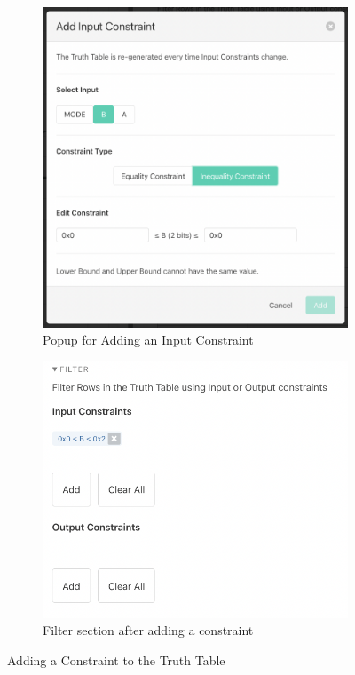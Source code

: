 \begin{figure}[h]
     \centering
     \begin{subfigure}[b]{0.4\textwidth}
         \centering
         \includegraphics[width=\textwidth]{04.AnalysisDesign/constraintadder.png}
         \caption{Popup for Adding an Input Constraint}
         \label{fig:addconstraint}
     \end{subfigure}
     \begin{subfigure}[b]{0.4\textwidth}
         \centering
         \includegraphics[width=\textwidth]{04.AnalysisDesign/tabwithconstraint.png}
         \caption{Filter section after adding a constraint}
         \label{fig:tabwithconstraint}
     \end{subfigure}
        \caption{Adding a Constraint to the Truth Table}
        \label{fig:tttab}
\end{figure}

